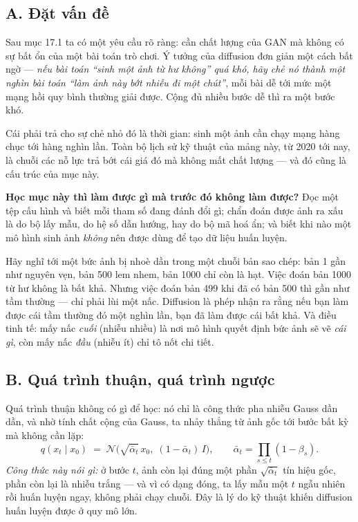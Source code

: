 \documentclass[../../../deep_learning.tex]{subfiles}
\begin{document}
\subsection{A. Đặt vấn đề}
Sau mục 17.1 ta có một yêu cầu rõ ràng: cần chất lượng của GAN mà không có sự bất ổn của một bài toán trò chơi. Ý tưởng của diffusion đơn giản một cách bất ngờ --- \emph{nếu bài toán ``sinh một ảnh từ hư không'' quá khó, hãy chẻ nó thành một nghìn bài toán ``làm ảnh này bớt nhiễu đi một chút''}, mỗi bài dễ tới mức một mạng hồi quy bình thường giải được. Cộng đủ nhiều bước dễ thì ra một bước khó.

Cái phải trả cho sự chẻ nhỏ đó là thời gian: sinh một ảnh cần chạy mạng hàng chục tới hàng nghìn lần. Toàn bộ lịch sử kỹ thuật của mảng này, từ 2020 tới nay, là chuỗi các nỗ lực trả bớt cái giá đó mà không mất chất lượng --- và đó cũng là cấu trúc của mục này.

\textbf{Học mục này thì làm được gì mà trước đó không làm được?} Đọc một tệp cấu hình  và biết mỗi tham số đang đánh đổi gì; chẩn đoán được ảnh ra xấu là do bộ lấy mẫu, do hệ số dẫn hướng, hay do bộ mã hoá ẩn; và biết khi nào một mô hình sinh ảnh \emph{không} nên được dùng để tạo dữ liệu huấn luyện.

\begin{trucgiac}
Hãy nghĩ tới một bức ảnh bị nhoè dần trong một chuỗi bản sao chép: bản 1 gần như nguyên vẹn, bản 500 lem nhem, bản 1000 chỉ còn là hạt. Việc đoán bản 1000 từ hư không là bất khả. Nhưng việc đoán bản 499 khi đã có bản 500 thì gần như tầm thường --- chỉ phải lùi một nấc. Diffusion là phép nhận ra rằng nếu bạn làm được cái tầm thường đó một nghìn lần, bạn đã làm được cái bất khả. Và điều tinh tế: mấy nấc \emph{cuối} (nhiễu nhiều) là nơi mô hình quyết định bức ảnh sẽ vẽ \emph{cái gì}, còn mấy nấc \emph{đầu} (nhiễu ít) chỉ tô nốt chi tiết.
\end{trucgiac}

\subsection{B. Quá trình thuận, quá trình ngược}
Quá trình thuận không có gì để học: nó chỉ là công thức pha nhiễu Gauss dần dần, và nhờ tính chất cộng của Gauss, ta nhảy thẳng từ ảnh gốc tới bước bất kỳ mà không cần lặp:
\[
q(x_t \mid x_0) \;=\; \mathcal{N}\!\bigl(\sqrt{\bar\alpha_t}\,x_0,\;(1-\bar\alpha_t)\,I\bigr),
\qquad \bar\alpha_t=\prod_{s\le t}(1-\beta_s).
\]
\emph{Công thức này nói gì:} ở bước \(t\), ảnh còn lại đúng một phần \(\sqrt{\bar\alpha_t}\) tín hiệu gốc, phần còn lại là nhiễu trắng --- và vì có dạng đóng, ta lấy mẫu một \(t\) ngẫu nhiên rồi huấn luyện ngay, không phải chạy chuỗi. Đây là lý do kỹ thuật khiến diffusion huấn luyện được ở quy mô lớn.
\end{document}
